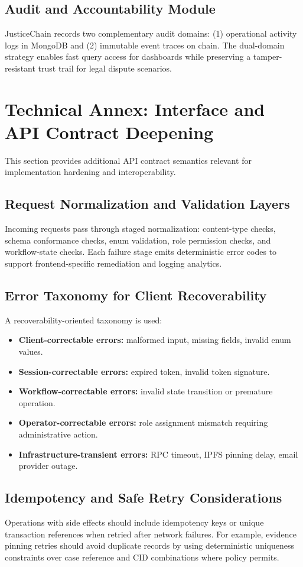 \documentclass[conference]{IEEEtran}
\begin{document}
\subsection{Audit and Accountability Module}
JusticeChain records two complementary audit domains: (1) operational activity logs in MongoDB and (2) immutable event traces on chain. The dual-domain strategy enables fast query access for dashboards while preserving a tamper-resistant trust trail for legal dispute scenarios.

\section{Technical Annex: Interface and API Contract Deepening}
This section provides additional API contract semantics relevant for implementation hardening and interoperability.

\subsection{Request Normalization and Validation Layers}
Incoming requests pass through staged normalization: content-type checks, schema conformance checks, enum validation, role permission checks, and workflow-state checks. Each failure stage emits deterministic error codes to support frontend-specific remediation and logging analytics.

\subsection{Error Taxonomy for Client Recoverability}
A recoverability-oriented taxonomy is used:
\begin{itemize}
    \item \textbf{Client-correctable errors:} malformed input, missing fields, invalid enum values.
    \item \textbf{Session-correctable errors:} expired token, invalid token signature.
    \item \textbf{Workflow-correctable errors:} invalid state transition or premature operation.
    \item \textbf{Operator-correctable errors:} role assignment mismatch requiring administrative action.
    \item \textbf{Infrastructure-transient errors:} RPC timeout, IPFS pinning delay, email provider outage.
\end{itemize}

\subsection{Idempotency and Safe Retry Considerations}
Operations with side effects should include idempotency keys or unique transaction references when retried after network failures. For example, evidence pinning retries should avoid duplicate records by using deterministic uniqueness constraints over case reference and CID combinations where policy permits.
\end{document}
